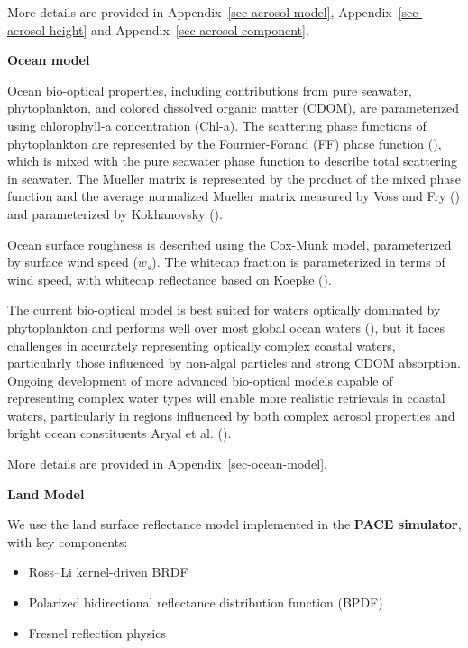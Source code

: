 \documentclass[
  11pt,
  letterpaper,
]{scrreprt}
\providecommand{\tightlist}{%
  \setlength{\itemsep}{0pt}\setlength{\parskip}{0pt}}
\begin{document}
More details are provided in Appendix~\ref{sec-aerosol-model},
Appendix~\ref{sec-aerosol-height} and
Appendix~\ref{sec-aerosol-component}.

\textbf{Ocean model}

Ocean bio-optical properties, including contributions from pure
seawater, phytoplankton, and colored dissolved organic matter (CDOM),
are parameterized using chlorophyll-a concentration (Chl-a). The
scattering phase functions of phytoplankton are represented by the
Fournier-Forand (FF) phase function
(), which is
mixed with the pure seawater phase function to describe total scattering
in seawater. The Mueller matrix is represented by the product of the
mixed phase function and the average normalized Mueller matrix measured
by Voss and Fry () and parameterized by
Kokhanovsky ().

Ocean surface roughness is described using the Cox-Munk model,
parameterized by surface wind speed (\(w_s\)). The whitecap fraction is
parameterized in terms of wind speed, with whitecap reflectance based on
Koepke ().

The current bio-optical model is best suited for waters optically
dominated by phytoplankton and performs well over most global ocean
waters (), but it faces
challenges in accurately representing optically complex coastal waters,
particularly those influenced by non-algal particles and strong CDOM
absorption. Ongoing development of more advanced bio-optical models
capable of representing complex water types will enable more realistic
retrievals in coastal waters, particularly in regions influenced by both
complex aerosol properties and bright ocean constituents Aryal et al.
().

More details are provided in Appendix~\ref{sec-ocean-model}.

\textbf{Land Model}

We use the land surface reflectance model implemented in the
\textbf{PACE simulator}, with key components:

\begin{itemize}
\tightlist
\item
  Ross--Li kernel-driven BRDF\\
\item
  Polarized bidirectional reflectance distribution function (BPDF)\\
\item
  Fresnel reflection physics
\end{itemize}
\end{document}
